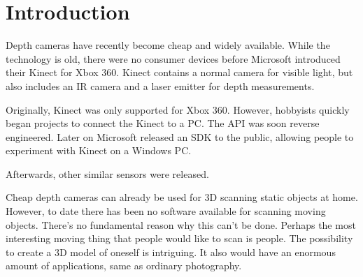 \chapter{Introduction}

 Depth cameras have recently become cheap and widely available. While the technology is old, there were no consumer devices before Microsoft introduced their Kinect for Xbox 360. Kinect contains a normal camera for visible light, but also includes an IR camera and a laser emitter for depth measurements. 

Originally, Kinect was only supported for Xbox 360. However, hobbyists quickly began projects to connect the Kinect to a PC. The API was soon reverse engineered. Later on Microsoft released an SDK to the public, allowing people to experiment with Kinect on a Windows PC.

Afterwards, other similar sensors were released. 

Cheap depth cameras can already be used for 3D scanning static objects at home. However, to date there has been no software available for scanning moving objects. There's no fundamental reason why this can't be done. Perhaps the most interesting moving thing that people would like to scan is people. The possibility to create a 3D model of oneself is intriguing. It also would have an enormous amount of applications, same as ordinary photography.


